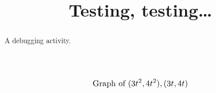 \documentclass{ximera}
\title{Testing, testing\dots}
\begin{document}
\begin{abstract}
  A debugging activity.
\end{abstract}
\maketitle
        \[
        \text{Graph of $(3t^2, 4t^2),(3t,4t)$}
        \]

\end{document}
